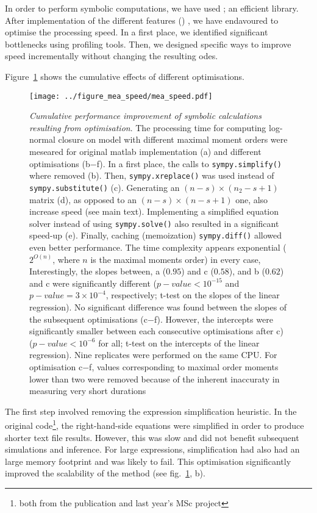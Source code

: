 In order to perform symbolic computations, we have used \sympy{} \cite{sympy_development_team_sympy:_2014}; an efficient \py{} library.
After implementation of the different features ()
, we have endavoured to optimise the processing speed.
In a first place, we identified significant bottlenecks using \py{} profiling tools.
Then, we designed specific ways to improve speed incrementally without changing the resulting \gls{ode}s.

Figure~\ref{fig:mea_speed} shows the cumulative effects of different optimisations.


\begin{figure}

\texttt{[image: ../figure\_mea\_speed/mea\_speed.pdf]}
\caption{\emph{Cumulative performance improvement of symbolic calculations resulting from optimisation}.
The processing time for computing log-normal closure on \pft{} model with different maximal moment orders were meseared for original matlab implementation (a) and different optimisations (b$-$f).
In a first place, the calls to \texttt{sympy.simplify()} where removed (b). 
Then, \texttt{sympy.xreplace()} was used instead of \texttt{sympy.substitute()} (c). 
Generating an $(n-s) \times (n_2-s + 1)$ matrix (d), as opposed to an $(n-s) \times (n-s + 1)$ one, also increase speed (see main text).
Implementing a simplified equation solver instead of using \texttt{sympy.solve()} also resulted in a significant speed-up (e). Finally, caching (memoization) \texttt{sympy.diff()} allowed even better performance.
The time complexity appears exponential ($2^{O(n)}$, where $n$ is the maximal moments order) in every case, 
Interestingly, the slopes between, a ($0.95$) and c ($0.58$), and b ($0.62$) and c were significantly different ($p-value <10^{-15}$ and $p-value = 3 \times 10^{-4}$, respectively; t-test on the slopes of the linear regression). 
No significant difference was found between the slopes of the subsequent optimisations (c$-$f). 
However, the intercepts were significantly smaller between each consecutive optimisations after c) ($p-value < 10^{-6}$ for all; t-test on the intercepts of the linear regression).
Nine replicates were performed on the same CPU. For optimisation c$-$f, values corresponding to maximal order moments lower than two were removed because of the inherent inaccuraty in measuring very short durations}
\label{fig:mea_speed}
\end{figure}


The first step involved removing the expression simplification heuristic.
In the original code\footnote{both from the publication and last year's MSc project}, the right-hand-side equations were simplified in order to produce shorter text file results.
However, this was slow and did not benefit subsequent simulations and inference.
For large expressions, simplification had also had an large memory footprint and was likely to fail.
This optimisation significantly improved the scalability of the method (see fig.~\ref{fig:mea_speed}, b).

